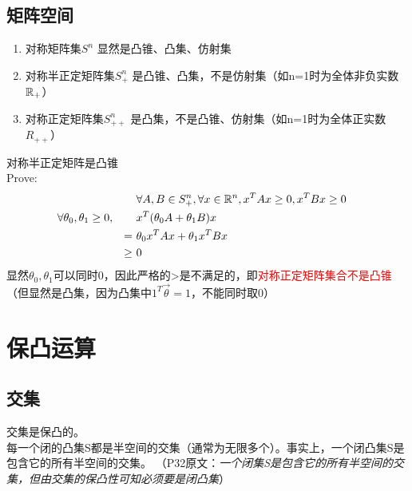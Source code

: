 \documentclass{mytemplate}
\begin{document}
\newpage
\subsection{矩阵空间}
\begin{proposition}
    \hspace*{1em}
    \begin{enumerate}
        \item 对称矩阵集$S^n$ \qquad\qquad\quad 显然是凸锥、凸集、仿射集
        \item 对称半正定矩阵集$S_+^n$ \qquad 是凸锥、凸集，不是仿射集（如n=1时为全体非负实数$\mathbb{R}_+$）
        \item 对称正定矩阵集$S_{++}^n$ \qquad 是凸集，不是凸锥、仿射集（如n=1时为全体正实数$R_{++}$）
    \end{enumerate}
\end{proposition}
对称半正定矩阵是凸锥\\
Prove:
\begin{align}
     &                                   &        & \forall A,B \in S_+^n, \forall  x\in \mathbb{R}^n, x^T A x \geq 0, x^T B x \geq 0 &  & \\
     & \forall \theta_0,\theta_1 \geq 0, &        & x^T(\theta_0 A+\theta_1B)x                                                &  & \\
     &                                   & =\     & \theta_0x^T A x+\theta_1x^T B x                                           &  & \\
     &                                   & \geq\  & 0                                                                         &  &
\end{align}
显然$\theta_0, \theta_1$可以同时0，因此严格的>是不满足的，即\textcolor{red}{对称正定矩阵集合不是凸锥}\\
（但显然是凸集，因为凸集中$1^T\vec{\theta} = 1$，不能同时取0）
                       
\section{保凸运算}

\subsection{交集} 
\noindent
交集是保凸的。\\
每一个闭的凸集S都是半空间的交集（通常为无限多个）。事实上，一个闭凸集S是包含它的所有半空间的交集。
（P32原文：\emph{一个闭集S是包含它的所有半空间的交集，但由交集的保凸性可知必须要是闭凸集}）
\end{document}

